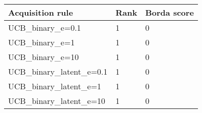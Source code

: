 \begin{tabular}{lll}
Acquisition rule & Rank & Borda score \\ 
\hline 
UCB_binary_e=0.1        & 1 & 0 \\ 
UCB_binary_e=1          & 1 & 0 \\ 
UCB_binary_e=10         & 1 & 0 \\ 
UCB_binary_latent_e=0.1 & 1 & 0 \\ 
UCB_binary_latent_e=1   & 1 & 0 \\ 
UCB_binary_latent_e=10  & 1 & 0 \\ 
\hline 
\end{tabular}